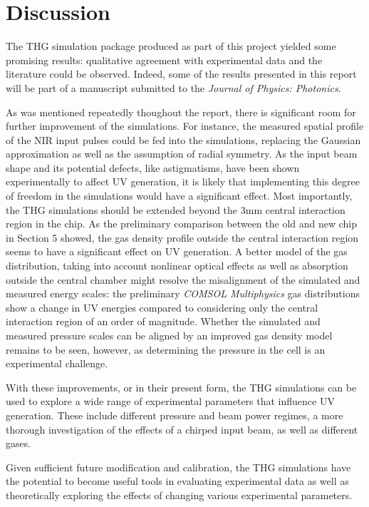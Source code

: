 \documentclass[a4paper]{jpconf}
\begin{document}
\section{Discussion}
The THG simulation package produced as part of this project yielded some promising results: qualitative agreement with experimental data and the literature could be observed. Indeed, some of the results presented in this report will be part of a manuscript submitted to the \textit{Journal of Physics: Photonics}. \par 


As was mentioned repeatedly thoughout the report, there is significant room for further improvement of the simulations. For instance, the measured spatial profile of the NIR input pulses could be fed into the simulations, replacing the Gaussian approximation as well as the assumption of radial symmetry. As the input beam shape and its potential defects, like astigmatisms, have been shown experimentally to affect UV generation, it is likely that implementing this degree of freedom in the simulations would have a significant effect. Most importantly, the THG simulations should be extended beyond the 3mm central interaction region in the chip. As the preliminary comparison between the old and new chip in Section 5 showed, the gas density profile outside the central interaction region seems to have a significant effect on UV generation.  A better model of the gas distribution, taking into account nonlinear optical effects as well as absorption outside the central chamber might resolve the misalignment of the simulated and measured energy scales: the preliminary \textit{COMSOL Multiphysics} gas distributions show a change in UV energies compared to considering only the central interaction region of an order of magnitude. Whether the simulated and measured pressure scales can be aligned by an improved gas density model remains to be seen, however, as determining the pressure in the cell is an experimental challenge. \par 
With these improvements, or in their present form, the THG simulations can be used to explore a wide range of experimental parameters that influence UV generation. These include different pressure and beam power regimes, a more thorough investigation of the effects of a chirped input beam, as well as different gases. \par 
Given sufficient future modification and calibration, the THG simulations have the potential to become useful tools in evaluating experimental data as well as theoretically exploring the effects of changing various experimental parameters.  
\end{document}
